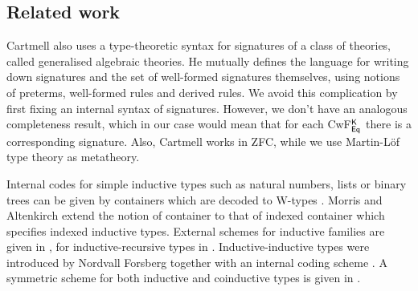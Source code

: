 \documentclass[acmsmall,review,anonymous]{acmart}\settopmatter{printfolios=true,printccs=false,printacmref=false}
\begin{document}

\subsection{Related work}
\label{sec:related-work}

Cartmell \cite{gat} also uses a type-theoretic syntax for signatures
of a class of theories, called generalised algebraic theories. He mutually
defines the language for writing down signatures and the set of
well-formed signatures themselves, using notions of preterms,
well-formed rules and derived rules. We avoid this complication by
first fixing an internal syntax of signatures. However, we don't have
an analogous completeness result, which in our case would mean that
for each CwF$^{\mathsf{K}}_{\mathsf{Eq}}$ there is a corresponding signature. Also,
Cartmell works in ZFC, while we use Martin-Löf type theory as
metatheory.

Internal codes for simple inductive types such as
natural numbers, lists or binary trees can be given by containers
which are decoded to W-types \cite{abbot05containers}. Morris and
Altenkirch \cite{morris09indexed} extend the notion of container to
that of indexed container which specifies indexed inductive
types. External schemes for inductive families are given in
\cite{Dybjer97inductivefamilies,paulinmohring}, for
inductive-recursive types in \cite{dybjer00ir}. Inductive-inductive
types were introduced by Nordvall Forsberg together with an internal coding
scheme \cite{forsberg-phd}. A symmetric scheme for both inductive and
coinductive types is given in \cite{henning}.
\end{document}
